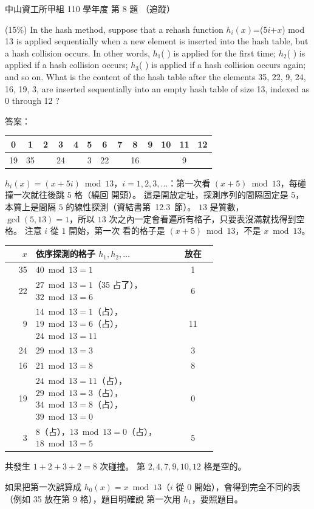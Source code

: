 \begin{pastexam}[label={px:nsysu-110-osds-02}]{中山資工所甲組 110 學年度 第 8 題}
（追蹤）

(15\%) In the hash method, suppose that a rehash function $h_i(x)$=(5$i$+$x$) mod 13 is applied
sequentially when a new element is inserted into the hash table, but a hash collision occurs. In
other words, $h_1$( ) is applied for the first time; $h_2$( ) is applied if a hash collision occurs;
$h_3$( ) is applied if a hash collision occurs again; and so on. What is the content of the hash
table after the elements 35, 22, 9, 24, 16, 19, 3, are inserted sequentially into an empty hash table
of size 13, indexed as 0 through 12 ?
\end{pastexam}

\begin{pastsoln}
答案：
\begin{center}
\begin{tabular}{*{13}{c}}
\toprule
0 & 1 & 2 & 3 & 4 & 5 & 6 & 7 & 8 & 9 & 10 & 11 & 12 \\
\midrule
19 & 35 & & 24 & & 3 & 22 & & 16 & & & 9 & \\
\bottomrule
\end{tabular}
\end{center}

$h_i(x) = (x + 5i) \bmod 13$，$i = 1, 2, 3, \ldots$：第一次看 $(x + 5) \bmod 13$，每碰撞一次就往後跳 $5$ 格（繞回
開頭）。 這是開放定址，探測序列的間隔固定是 $5$，本質上是間隔 $5$ 的線性探測（資結書第~12.3~節）。 $13$ 是質數，
$\gcd(5, 13) = 1$，所以 $13$ 次之內一定會看遍所有格子，只要表沒滿就找得到空格。 注意 $i$ 從 $1$ 開始，第一次
看的格子是 $(x + 5) \bmod 13$，不是 $x \bmod 13$。
\begin{center}
\begin{tabular}{rp{0.68\linewidth}c}
\toprule
$x$ & 依序探測的格子 $h_1, h_2, \ldots$ & 放在 \\
\midrule
35 & $40 \bmod 13 = 1$ & 1 \\
22 & $27 \bmod 13 = 1$（35 占了），$32 \bmod 13 = 6$ & 6 \\
9 & $14 \bmod 13 = 1$（占），$19 \bmod 13 = 6$（占），$24 \bmod 13 = 11$ & 11 \\
24 & $29 \bmod 13 = 3$ & 3 \\
16 & $21 \bmod 13 = 8$ & 8 \\
19 & $24 \bmod 13 = 11$（占），$29 \bmod 13 = 3$（占），$34 \bmod 13 = 8$（占），$39 \bmod 13 = 0$ & 0 \\
3 & $8$（占），$13 \bmod 13 = 0$（占），$18 \bmod 13 = 5$ & 5 \\
\bottomrule
\end{tabular}
\end{center}
共發生 $1 + 2 + 3 + 2 = 8$ 次碰撞。 第 $2, 4, 7, 9, 10, 12$ 格是空的。

如果把第一次誤算成 $h_0(x) = x \bmod 13$（$i$ 從 $0$ 開始），會得到完全不同的表（例如 35 放在第 $9$ 格），題目明確說
第一次用 $h_1$，要照題目。
\end{pastsoln}

